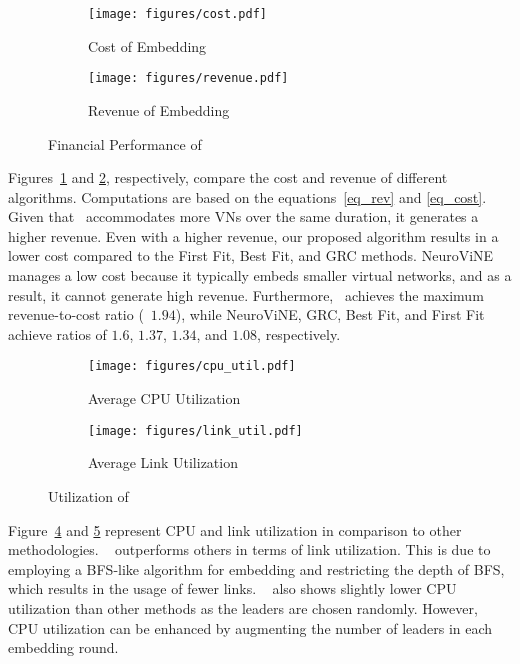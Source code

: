 \begin{figure}[t]
    \begin{subfigure}{0.49\linewidth}
	\centering
	\texttt{[image: figures/cost.pdf]}
	\caption{Cost of Embedding}
	\label{fig:cost}
    \end{subfigure}
    \hfill
    \begin{subfigure}{0.49\linewidth}
	\centering
	\texttt{[image: figures/revenue.pdf]}
	\caption{Revenue of Embedding}
	\label{fig:revenue}
    \end{subfigure}
    \caption{Financial Performance of \ourAlg}
    \label{fig:fperformance}
\end{figure}
Figures~\ref{fig:cost} and \ref{fig:revenue}, respectively, compare the cost and revenue of different algorithms. Computations are based on the equations~\eqref{eq_rev} and \eqref{eq_cost}.
Given that \ourAlg\ accommodates more VNs over the same duration, it generates a higher revenue. Even with a higher revenue, our proposed algorithm results in a lower cost compared to the First Fit, Best Fit, and GRC methods. NeuroViNE manages a low cost because it typically embeds smaller virtual networks, and as a result, it cannot generate high revenue. Furthermore, \ourAlg\ achieves the maximum revenue-to-cost ratio (\ie\ $1.94$), while NeuroViNE, GRC, Best Fit, and First Fit achieve ratios of $1.6$, $1.37$, $1.34$, and $1.08$, respectively.


\begin{figure}[t]
    \begin{subfigure}{0.49\linewidth}
	\centering
	\texttt{[image: figures/cpu\_util.pdf]}
	\caption{Average CPU Utilization}
	\label{fig:cpu-util}
    \end{subfigure}
    \hfill
    \begin{subfigure}{0.49\linewidth}
        \centering
	\texttt{[image: figures/link\_util.pdf]}
	\caption{Average Link Utilization}
	\label{fig:link-util}
    \end{subfigure}
    \caption{Utilization of \ourAlg}
    \label{fig:utilization}
\end{figure}
Figure~\ref{fig:cpu-util} and \ref{fig:link-util} represent CPU and link utilization in comparison to other methodologies. \ourAlg~ outperforms others in terms of link utilization. This is due to \ourAlg~ employing a BFS-like algorithm for embedding and restricting the depth of BFS, which results in the usage of fewer links. \ourAlg~ also shows slightly lower CPU utilization than other methods as the leaders are chosen randomly. However, CPU utilization can be enhanced by augmenting the number of leaders in each embedding round.


